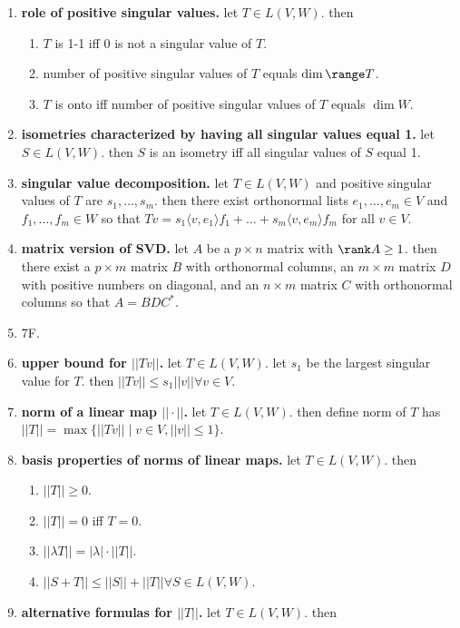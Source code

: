\begin{enumerate}
	\item \textbf{role of positive singular values. } let $T \in L(V,W)$. then 
	\begin{enumerate}
		\item $T$ is 1-1 iff 0 is not a singular value of $T$. 
		\item number of positive singular values of $T$ equals $\dim\range T$. 
		\item $T$ is onto iff number of positive singular values of $T$ equals $\dim W$. 
	\end{enumerate}
	\item \textbf{isometries characterized by having all singular values equal 1. } let $S \in L(V,W)$. then $S$ is an isometry iff all singular values of $S$ equal 1. 
	\item \textbf{singular value decomposition. } let $T \in L(V,W)$ and positive singular values of $T$ are $s_1,\dots,s_m$. then there exist orthonormal lists $e_1,\dots,e_m \in V$ and $f_1,\dots,f_m \in W$ so that $Tv = s_1 \langle v,e_1 \rangle f_1 + \dots + s_m \langle v,e_m \rangle f_m$ for all $v \in V$. 
	\item \textbf{matrix version of SVD. } let $A$ be a $p \times n$ matrix with $\rank A \geq 1$. then there exist a $p \times m$ matrix $B$ with orthonormal columns, an $m \times m$ matrix $D$ with positive numbers on diagonal, and an $n \times m$ matrix $C$ with orthonormal columns so that $A=BDC^*$. 
	\item 7F. 
	\item \textbf{upper bound for $||Tv||$. } let $T \in L(V,W)$. let $s_1$ be the largest singular value for $T$. then $||Tv|| \leq s_1||v|| \forall v \in V$.
	\item \textbf{norm of a linear map $||\cdot||$. } let $T \in L(V,W)$. then define norm of $T$ has $||T|| = \max\{||Tv|| \mid v \in V, ||v|| \leq 1\}$. 
	\item \textbf{basis properties of norms of linear maps. } let $T \in L(V,W)$. then 
	\begin{enumerate}
		\item $||T|| \geq 0$. 
		\item $||T||=0$ iff $T=0$. 
		\item $||\lambda T|| = |\lambda| \cdot ||T||$. 
		\item $||S+T|| \leq ||S|| + ||T|| \forall S \in L(V,W)$. 
	\end{enumerate}
	\item \textbf{alternative formulas for $||T||$. } let $T \in L(V,W)$. then
	\begin{enumerate}

\end{enumerate}
\end{enumerate}
